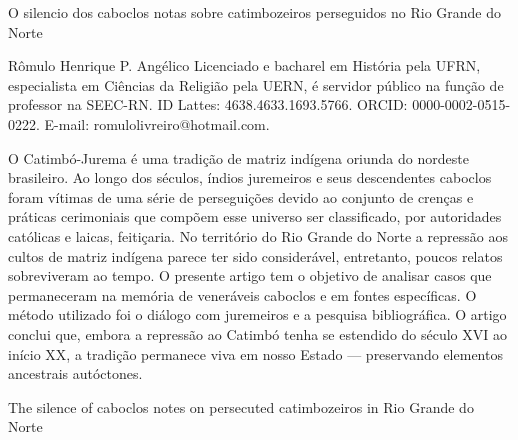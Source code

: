 \begin{refsection}
    \renewcommand{\thefigure}{\arabic{figure}}

    \chapterTwoLines
    {O silencio dos caboclos}
    {notas sobre catimbozeiros perseguidos no Rio Grande do Norte}
    \label{chap:silencio}
    
    \articleAuthor
    {Rômulo Henrique P. Angélico}
    {Licenciado e bacharel em História pela UFRN, especialista em Ciências da Religião pela UERN, é servidor público na função de professor na SEEC-RN. ID Lattes: 4638.4633.1693.5766. ORCID: 0000-0002-0515-0222. E-mail: romulo\textunderscore{}livreiro@hotmail.com.}

    \begin{galoResumo}
        O Catimbó-Jurema é uma tradição de matriz indígena oriunda do nordeste brasileiro. Ao longo dos séculos, índios juremeiros e seus descendentes caboclos foram vítimas de uma série de perseguições devido ao conjunto de crenças e práticas cerimoniais que compõem esse universo ser classificado, por autoridades católicas e laicas, feitiçaria. No território do Rio Grande do Norte a repressão aos cultos de matriz indígena parece ter sido considerável, entretanto, poucos relatos sobreviveram ao tempo. O presente artigo tem o objetivo de analisar casos que permaneceram na memória de veneráveis caboclos e em fontes específicas. O método utilizado foi o diálogo com juremeiros e a pesquisa bibliográfica. O artigo conclui que, embora a repressão ao Catimbó tenha se estendido do século XVI ao início XX, a tradição permanece viva em nosso Estado --- preservando elementos ancestrais autóctones.
    \end{galoResumo}
    
    
    \begin{otherlanguage}{english}
    
    \fakeChapterTwoLines
    {The silence of caboclos}
    {notes on persecuted catimbozeiros in Rio Grande do Norte}


\end{otherlanguage}
\end{refsection}
